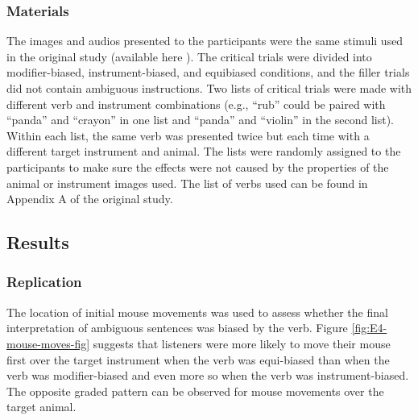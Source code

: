 \documentclass[
  man,floatsintext]{apa6}
\begin{document}
\hypertarget{materials-1}{%
\subsubsection{Materials}\label{materials-1}}

The images and audios presented to the participants were the same
stimuli used in the original study (available here ). The critical
trials were divided into modifier-biased, instrument-biased, and
equibiased conditions, and the filler trials did not contain ambiguous
instructions. Two lists of critical trials were made with different verb
and instrument combinations (e.g., ``rub'' could be paired with ``panda''
and ``crayon'' in one list and ``panda'' and ``violin'' in the second list).
Within each list, the same verb was presented twice but each time with a
different target instrument and animal. The lists were randomly assigned
to the participants to make sure the effects were not caused by the
properties of the animal or instrument images used. The list of verbs
used can be found in Appendix A of the original study.

\hypertarget{results-3}{%
\subsection{Results}\label{results-3}}

\hypertarget{replication-2}{%
\subsubsection{Replication}\label{replication-2}}

The location of initial mouse movements was used to assess whether the final interpretation of ambiguous sentences was biased by the verb. Figure \ref{fig:E4-mouse-moves-fig} suggests that listeners were more likely to move their mouse first over the target instrument when the verb was equi-biased than when the verb was modifier-biased and even more so when the verb was instrument-biased. The opposite graded pattern can be observed for mouse movements over the target animal.
\end{document}
